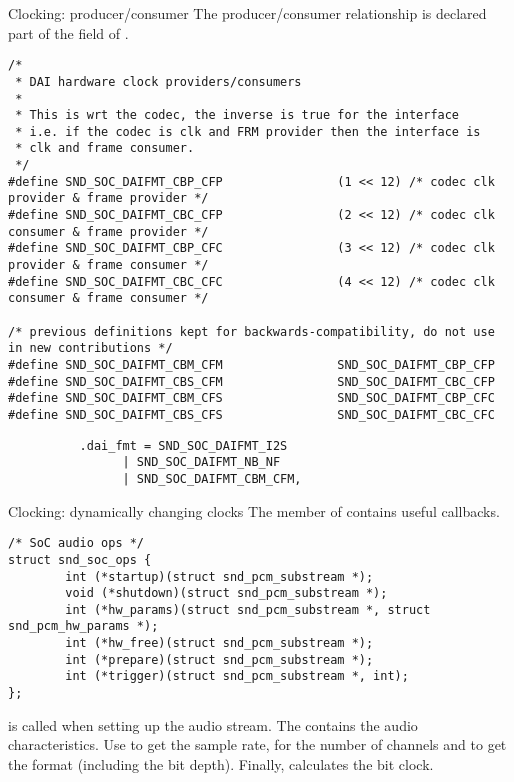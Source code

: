 \begin{frame}[fragile]{Clocking: producer/consumer}
  The producer/consumer relationship is declared part of the
   field of .
  \begin{block}{}
    \fontsize{6}{6}\selectfont
    \begin{verbatim}
/*
 * DAI hardware clock providers/consumers
 *
 * This is wrt the codec, the inverse is true for the interface
 * i.e. if the codec is clk and FRM provider then the interface is
 * clk and frame consumer.
 */
#define SND_SOC_DAIFMT_CBP_CFP                (1 << 12) /* codec clk provider & frame provider */
#define SND_SOC_DAIFMT_CBC_CFP                (2 << 12) /* codec clk consumer & frame provider */
#define SND_SOC_DAIFMT_CBP_CFC                (3 << 12) /* codec clk provider & frame consumer */
#define SND_SOC_DAIFMT_CBC_CFC                (4 << 12) /* codec clk consumer & frame consumer */

/* previous definitions kept for backwards-compatibility, do not use in new contributions */
#define SND_SOC_DAIFMT_CBM_CFM                SND_SOC_DAIFMT_CBP_CFP
#define SND_SOC_DAIFMT_CBS_CFM                SND_SOC_DAIFMT_CBC_CFP
#define SND_SOC_DAIFMT_CBM_CFS                SND_SOC_DAIFMT_CBP_CFC
#define SND_SOC_DAIFMT_CBS_CFS                SND_SOC_DAIFMT_CBC_CFC
    \end{verbatim}
  \end{block}
  \begin{block}{}
    \fontsize{9}{9}\selectfont
    \begin{verbatim}
          .dai_fmt = SND_SOC_DAIFMT_I2S
                | SND_SOC_DAIFMT_NB_NF
                | SND_SOC_DAIFMT_CBM_CFM,
    \end{verbatim}
  \end{block}
\end{frame}

\begin{frame}[fragile]{Clocking: dynamically changing clocks}
  The  member of  contains
  useful callbacks.
  \begin{block}{}
    \fontsize{10}{10}\selectfont
    \begin{verbatim}
/* SoC audio ops */
struct snd_soc_ops {
        int (*startup)(struct snd_pcm_substream *);
        void (*shutdown)(struct snd_pcm_substream *);
        int (*hw_params)(struct snd_pcm_substream *, struct snd_pcm_hw_params *);
        int (*hw_free)(struct snd_pcm_substream *);
        int (*prepare)(struct snd_pcm_substream *);
        int (*trigger)(struct snd_pcm_substream *, int);
};
    \end{verbatim}
  \end{block}
   is called when setting up the audio stream. The
   contains the audio characteristics.
  Use  to get the sample rate,
   for the number of channels and
   to get the format (including the bit depth).
  Finally,  calculates the bit clock.
\end{frame}

